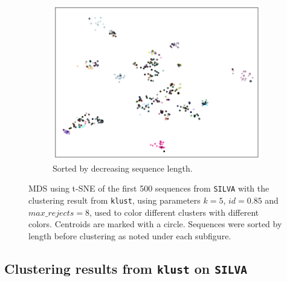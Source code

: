 \begin{figure}[H]
  \ContinuedFloat
  \begin{subfigure}[b]{1.0\textwidth}
    \includegraphics[width=1.0\textwidth]{graphics/SILVA_t-SNE_decr_sort_500.png}
    \caption{Sorted by decreasing sequence length.}
    \label{fig:mds_silva_sort_decr}
  \end{subfigure}
  \caption{MDS using t-SNE of the first 500 sequences from \texttt{SILVA} with
    the clustering result from \texttt{klust}, using parameters $k=5$,
    $id=0.85$ and $max\_rejects=8$, used to color different clusters with
    different colors. Centroids are marked with a circle. Sequences were sorted
    by length before clustering as noted under each subfigure.}
  \label{fig:mds_silva}
\end{figure}

\newpage
\subsection{Clustering results from \texttt{klust} on \texttt{SILVA}}
\label{app:klust_data_parameters}

